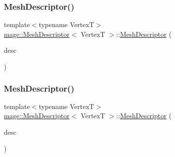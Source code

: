 \subsubsection{\texorpdfstring{Mesh\+Descriptor()}{MeshDescriptor()}\hspace{0.1cm}{\footnotesize\ttfamily [2/3]}}
{\footnotesize\ttfamily template$<$typename VertexT$>$ \\
\hyperlink{structmage_1_1_mesh_descriptor}{mage\+::\+Mesh\+Descriptor}$<$ VertexT $>$\+::\hyperlink{structmage_1_1_mesh_descriptor}{Mesh\+Descriptor} (\begin{DoxyParamCaption}\item[{const \hyperlink{structmage_1_1_mesh_descriptor}{Mesh\+Descriptor}$<$ VertexT $>$ \&}]{desc }\end{DoxyParamCaption})\hspace{0.3cm}{\ttfamily [default]}}

\hypertarget{structmage_1_1_mesh_descriptor_a62de61d0ea1ad1a514246f40e21c9faa}{}\label{structmage_1_1_mesh_descriptor_a62de61d0ea1ad1a514246f40e21c9faa} 
\subsubsection{\texorpdfstring{Mesh\+Descriptor()}{MeshDescriptor()}\hspace{0.1cm}{\footnotesize\ttfamily [3/3]}}
{\footnotesize\ttfamily template$<$typename VertexT$>$ \\
\hyperlink{structmage_1_1_mesh_descriptor}{mage\+::\+Mesh\+Descriptor}$<$ VertexT $>$\+::\hyperlink{structmage_1_1_mesh_descriptor}{Mesh\+Descriptor} (\begin{DoxyParamCaption}\item[{\hyperlink{structmage_1_1_mesh_descriptor}{Mesh\+Descriptor}$<$ VertexT $>$ \&\&}]{desc }\end{DoxyParamCaption})\hspace{0.3cm}{\ttfamily [default]}}

\hypertarget{structmage_1_1_mesh_descriptor_adca32db164ab3032164c8dfe17af3db4}{}\label{structmage_1_1_mesh_descriptor_adca32db164ab3032164c8dfe17af3db4} 
